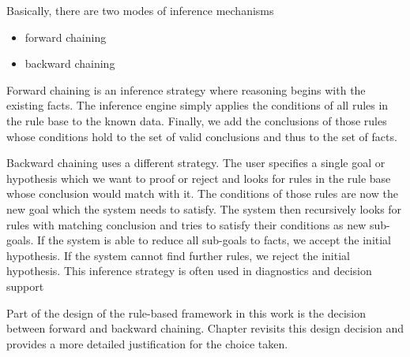 Basically, there are two modes of inference mechanisms\cite{https://doi.org/10.1002/widm.11}

\begin{itemize}
    \item forward chaining
    \item backward chaining
\end{itemize}


Forward chaining is an inference strategy where reasoning begins with the existing facts.
The inference engine simply applies the conditions of all rules in the rule base to the known data.
Finally,
we add the conclusions of those rules
whose conditions hold to the set of valid conclusions and thus to the set of facts.

Backward chaining uses a different strategy\cite{al2015comparison}.
The user specifies a single goal or hypothesis
which we want to proof or reject and looks for rules in the rule base whose conclusion would match with it.
The conditions of those rules are now the new goal which the system needs to satisfy.
The system then recursively looks for rules with matching conclusion
and tries to satisfy their conditions as new sub-goals.
If the system is able to reduce all sub-goals to facts, we accept the initial hypothesis.
If the system cannot find further rules, we reject the initial hypothesis.
This inference strategy is often used in diagnostics and decision support\cite{https://doi.org/10.1002/widm.11}

Part of the design of the rule-based framework in this work is the decision between forward and backward chaining.
Chapter  revisits this design decision
and provides a more detailed justification for the choice taken.
